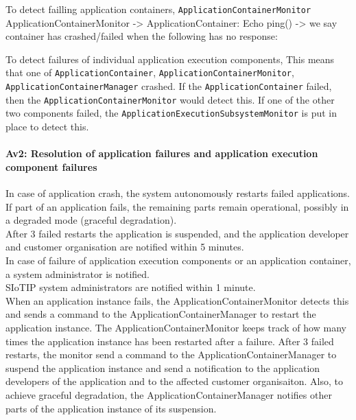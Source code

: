             To detect failling application containers, \texttt{ApplicationContainerMonitor}
                ApplicationContainerMonitor -> ApplicationContainer: Echo ping()
                -> we say container has crashed/failed when the following has no response:

            To detect failures of individual application execution components,
            This means that one of \texttt{ApplicationContainer}, \texttt{ApplicationContainerMonitor}, \texttt{ApplicationContainerManager} crashed.
            If the \texttt{ApplicationContainer} failed, then the \texttt{ApplicationContainerMonitor} would detect this.
            If one of the other two components failed, the \texttt{ApplicationExecutionSubsystemMonitor} is put in place to detect this.


        \paragraph{Av2: Resolution of application failures and application execution component failures}
            In case of application crash, the system autonomously restarts failed applications.
            If part of an application fails, the remaining parts remain operational,
            possibly in a degraded mode (graceful degradation). \\
            After 3 failed restarts the application is suspended, and the
            application developer and customer organisation are notified within 5 minutes.\\

            In case of failure of application execution components or an application
            container, a system administrator is notified. \\
            SIoTIP system administrators are notified within 1 minute.\\

            When an application instance fails, the ApplicationContainerMonitor detects this and
            sends a command to the ApplicationContainerManager to restart the application instance.
            The ApplicationContainerMonitor keeps track of how many times the
            application instance has been restarted after a failure. After 3 failed restarts, the monitor
            send a command to the ApplicationContainerManager to suspend the application instance and send
            a notification to the application developers of the application and to the
            affected customer organisaiton. Also, to achieve graceful degradation,
            the ApplicationContainerManager notifies other parts of the application instance
            of its suspension.

